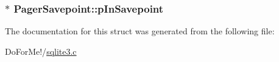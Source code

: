 \hypertarget{struct_pager_savepoint_abf7d6dc9d457c866727f84c4b9e0348f}{
\subsubsection[{p\-In\-Savepoint}]{$\ast$ Pager\-Savepoint\-::p\-In\-Savepoint}}\label{struct_pager_savepoint_abf7d6dc9d457c866727f84c4b9e0348f}


The documentation for this struct was generated from the following file\-:\begin{DoxyCompactItemize}
\item 
Do\-For\-Me!/\hyperlink{sqlite3_8c}{sqlite3.\-c}\end{DoxyCompactItemize}
